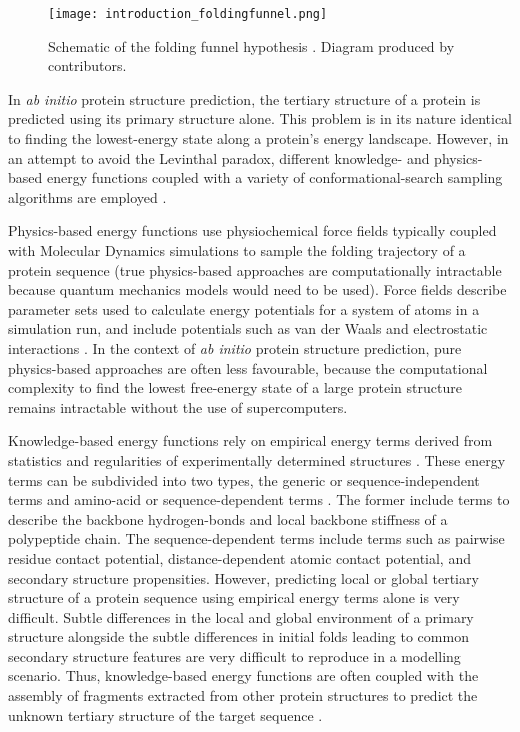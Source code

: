 \begin{figure}[H]
    \centering
    \texttt{[image: introduction\_foldingfunnel.png]}
    \caption[Schematic of the folding funnel hypothesis.]{Schematic of the folding funnel hypothesis \cite{Leopold1992-yf}. Diagram produced by \textcite{Wikipedia-FoldingFunnel} contributors.}
    \label{fig:introduction_foldingfunnel}
\end{figure}

In \textit{ab initio} protein structure prediction, the tertiary structure of a protein is predicted using its primary structure alone. This problem is in its nature identical to finding the lowest-energy state along a protein's energy landscape. However, in an attempt to avoid the Levinthal paradox, different knowledge- and physics-based energy functions coupled with a variety of conformational-search sampling algorithms are employed \cite{Lee2017-oc}. 

Physics-based energy functions use physiochemical force fields typically coupled with Molecular Dynamics simulations to sample the folding trajectory of a protein sequence (true physics-based approaches are computationally intractable because quantum mechanics models would need to be used). Force fields describe parameter sets used to calculate energy potentials for a system of atoms in a simulation run, and include potentials such as van der Waals and electrostatic interactions \cite{Lee2017-oc}. In the context of \textit{ab initio} protein structure prediction, pure physics-based approaches are often less favourable, because the computational complexity to find the lowest free-energy state of a large protein structure remains intractable without the use of supercomputers.

Knowledge-based energy functions rely on empirical energy terms derived from statistics and regularities of experimentally determined structures \cite{Lee2017-oc}. These energy terms can be subdivided into two types, the generic or sequence-independent terms and amino-acid or sequence-dependent terms \cite{Skolnick2006-uv}. The former include terms to describe the backbone hydrogen-bonds and local backbone stiffness of a polypeptide chain. The sequence-dependent terms include terms such as pairwise residue contact potential, distance-dependent atomic contact potential, and secondary structure propensities. However, predicting local or global tertiary structure of a protein sequence using empirical energy terms alone is very difficult. Subtle differences in the local and global environment of a primary structure alongside the subtle differences in initial folds leading to common secondary structure features are very difficult to reproduce in a modelling scenario. Thus, knowledge-based energy functions are often coupled with the assembly of fragments extracted from other protein structures to predict the unknown tertiary structure of the target sequence \cite{Lee2017-oc}. 

